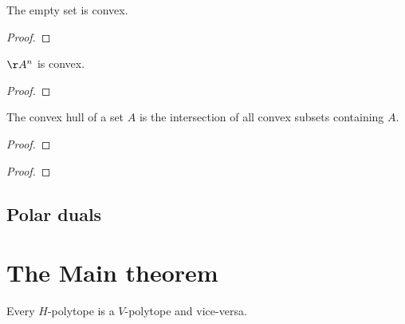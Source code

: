 \begin{lemma}
    \label{lem:empty_is_convex}
    The empty set is convex.
    \leanok
\end{lemma}

\begin{proof}
    \leanok
\end{proof}

\begin{lemma}
    \label{lem:ambient_is_convex}
    $\AA^n$ is convex.
    \leanok
\end{lemma}

\begin{proof}
    \leanok
\end{proof}

\begin{definition}
    \label{def:convex_hull}
    The convex hull of a set $A$ is the intersection of all convex subsets containing $A$.
    \leanok
\end{definition}

\begin{proposition}
    \label{prop:convex_hull_is_convex}  
    \leanok
\end{proposition}

\begin{proof}
    \leanok
\end{proof}

\begin{lemma}
    \label{lem:ch_of_empty_is_empty}
    \leanok
\end{lemma}

\begin{proof}
    \leanok
\end{proof}

\subsection{Polar duals}

\begin{definition}
    \label{def:polar_dual}
\end{definition}

\begin{proposition}
    \label{prop:dual_dual_is_id}
\end{proposition}

\section{The Main theorem}

\begin{theorem}
    \label{thm:h_v_equivalent}
    Every $H$-polytope is a $V$-polytope and vice-versa.
\end{theorem}